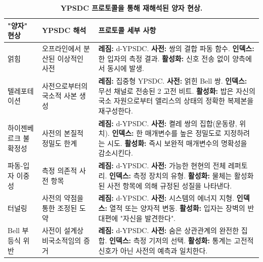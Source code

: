 \documentclass[12pt,a4paper]{article}
\begin{document}
	\begin{table}[htbp]
		\centering
		\caption{\normalsize\textbf{YPSDC 프로토콜을 통해 재해석된 양자 현상.}}
		\label{tab:quantum-ypsdc}
		\small
		\begin{tabular}{p{2.5cm} p{4.8cm} p{7.8cm}}
			\toprule
			\textbf{"양자" 현상} &
			\textbf{YPSDC 해석} &
			\textbf{프로토콜 세부 사항} \\
			\midrule
			얽힘 &
			오프라인에서 분산된 이상적인 사전 &
			\textbf{레짐:} d-YPSDC.\newline
			\textbf{사전:} 쌍의 결합 파동 함수.\newline
			\textbf{인덱스:} 한 입자의 측정 결과.\newline
			\textbf{활성화:} 신호 전송 없이 양측에서 동시에 발생. \\
			\midrule
			텔레포테이션 &
			사전으로부터의 국소적 사본 생성 &
			\textbf{레짐:} 집중형 YPSDC.\newline
			\textbf{사전:} 얽힌 Bell 쌍.\newline
			\textbf{인덱스:} 무선 채널로 전송된 2 고전 비트.\newline
			\textbf{활성화:} 밥은 자신의 국소 자원으로부터 앨리스의 상태의 정확한 복제본을 재구성한다. \\
			\midrule
			하이젠베르크 불확정성 &
			사전의 본질적 정밀도 한계 &
			\textbf{레짐:} d-YPSDC.\newline
			\textbf{사전:} 켤레 쌍의 집합(운동량, 위치).\newline
			\textbf{인덱스:} 한 매개변수를 높은 정밀도로 지정하려는 시도.\newline
			\textbf{활성화:} 즉시 보완적 매개변수의 명확성을 감소시킨다. \\
			\midrule
			파동-입자 이중성 &
			측정 의존적 사전 항목 &
			\textbf{레짐:} d-YPSDC.\newline
			\textbf{사전:} 가능한 현현의 전체 레퍼토리.\newline
			\textbf{인덱스:} 측정 장치의 유형.\newline
			\textbf{활성화:} 물체는 활성화된 사전 항목에 의해 규정된 성질을 나타낸다. \\
			\midrule
			터널링 &
			사전의 약점을 통한 조정된 도약 &
			\textbf{레짐:} d-YPSDC.\newline
			\textbf{사전:} 시스템의 에너지 지형.\newline
			\textbf{인덱스:} 열적 또는 양자적 변동.\newline
			\textbf{활성화:} 입자는 장벽의 반대편에 "자신을 발견한다". \\
			\midrule
			Bell 부등식 위반 &
			사전이 설계상 비국소적임의 증거 &
			\textbf{레짐:} d-YPSDC.\newline
			\textbf{사전:} 숨은 상관관계의 완전한 집합.\newline
			\textbf{인덱스:} 측정 기저의 선택.\newline
			\textbf{활성화:} 통계는 고전적 신호가 아닌 사전의 예측과 일치한다. \\
			\bottomrule
		\end{tabular}
	\end{table}
	
\end{document}
